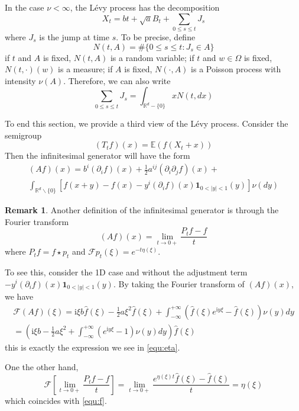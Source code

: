 \documentclass[10pt,a4paper]{article}
\newcommand{\ii}[0]{\mathrm{i}}
\newcommand{\RR}[0]{\mathbb{R}}
\theoremstyle{definition}
\newtheorem{remark}{Remark}
\begin{document}
In the case $\nu<\infty$, the L\'evy process has the decomposition
\begin{equation}
	X_t = bt + \sqrt{a}B_t + \sum_{0\leq s\leq t} J_s 
\end{equation}
where $J_s$ is the jump at time $s$. To be precise, define 
\begin{equation}
	N(t, A) = \#\{0\leq s\leq t: J_s\in A\}
\end{equation}
if $t$ and $A$ is fixed, $N(t, A)$ is a random variable; if $t$ and $w\in \Omega$ is fixed, $N(t, \cdot)(w)$ is a measure; if $A$ is fixed, $N(\cdot, A)$ is a Poisson process with intensity $\nu(A)$. Therefore, we can also write
\begin{equation}
	\sum_{0\leq s\leq t} J_s = \int_{\RR^d-\{0\}} xN(t, dx)
\end{equation}

To end this section, we provide a third view of the L\'evy process. Consider the semigroup 
\begin{equation}
	(T_tf)(x) = \mathbb{E}(f(X_t+x))
\end{equation}
Then the infinitesimal generator will have the form
\begin{multline}\label{equ:Af}
	(Af)(x) =  b^i(\partial_i f)(x) + \frac{1}{2}a^{ij}(\partial_i \partial_j f)(x) +\\
	\int_{\RR^d\backslash\{0\}} [f(x+y)-f(x)-y^i(\partial_i f)(x) \mathbf{1}_{0<|y|<1}(y)]\nu(dy)
\end{multline}

\begin{remark}
	Another definition of the infinitesimal generator is through the Fourier transform 
	\begin{equation}
		(Af)(x) = \lim_{t\rightarrow 0+} \frac{P_t f-f}{t}
	\end{equation}
	where $P_tf = f\star p_t$ and $\mathcal{F}p_t(\xi) = e^{-t\eta(\xi)}$. 
	
	To see this, consider the 1D case and without the adjustment term $-y^i(\partial_i f)(x) \mathbf{1}_{0<|y|<1}(y)$. By taking the Fourier transform of $(Af)(x)$, we have 
	\begin{multline}\label{equ:f}
		\mathcal{F}(Af)(\xi) = \ii\xi b\hat f(\xi ) - \frac{1}{2}a{\xi ^2}\hat f(\xi ) + \int_{ - \infty }^{ + \infty } {(\hat f(\xi ){e^{\ii y\xi }} - \hat f(\xi ))\nu (y)dy} \\
		=\left( {\ii\xi b - \frac{1}{2}a{\xi ^2} + \int_{ - \infty }^{ + \infty } {({e^{\ii y\xi }} - 1)\nu (y)dy} } \right)\hat f(\xi )
	\end{multline}
	this is exactly the expression we see in \cref{equ:eta}. 
	
	One the other hand, 
	\[\mathcal{F}\left[\mathop {\lim }\limits_{t \to 0 + } \frac{{{P_t}f - f}}{t}\right] = \mathop {\lim }\limits_{t \to 0 + } \frac{{{e^{\eta (\xi )t}}\hat f(\xi ) - \hat f(\xi )}}{t} = \eta (\xi )\]
	which coincides with \cref{equ:f}. 
	
\end{remark}
\end{document}
